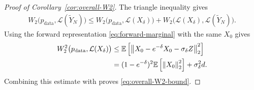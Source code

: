 \documentclass[11pt]{article}
\theoremstyle{definition}
\newcommand{\E}{\mathbb{E}}
\newcommand{\Law}{\mathcal{L}}
\newcommand{\pdata}{p_{\mathrm{data}}}
\newcommand{\Wtwo}{W_2}
\newcommand{\norm}[1]{\left\lVert #1\right\rVert_2}
\begin{document}
\begin{proof}[Proof of Corollary~\ref{cor:overall-W2}]
The triangle inequality gives
\begin{align}
    \Wtwo\bigl(\pdata,\Law(\widetilde Y_N)\bigr)
    \le
    \Wtwo\bigl(\pdata,\Law(X_\delta)\bigr)
    +\Wtwo\bigl(\Law(X_\delta),\Law(\widetilde Y_N)\bigr).
    \label{eq:overall-error-decomposition}
\end{align}
Using the forward representation \eqref{eq:forward-marginal} with the
same $X_0$ gives
\begin{align}
    \Wtwo^2\bigl(\pdata,\Law(X_\delta)\bigr)
    &\le
    \E\left[
        \norm{X_0-e^{-\delta}X_0-\sigma_\delta Z}^2
    \right]\notag\\
    &=
    (1-e^{-\delta})^2\E\left[\norm{X_0}^2\right]
    +\sigma_\delta^2d.
    \label{eq:early-stopping}
\end{align}
Combining this estimate with  proves
\eqref{eq:overall-W2-bound}.
\end{proof}
\end{document}
